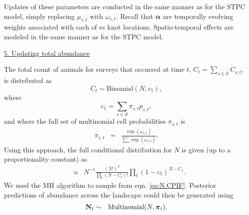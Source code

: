 \documentclass[12pt,fleqn]{article}
\begin{document}
\begin{flushleft}
Updates of these parameters are conducted in the same manner as for the STPC model, simply replacing
$\mu_{s,t}$ with $\omega_{s,t}$.  Recall that $\boldsymbol{\alpha}$ are temporally evolving weights associated
with each of $m$ knot locations.  Spatio-temporal effects are modeled in the same manner as for the STPC model.

\underline{5. Updating total abundance}

The total count of animals for surveys that occurred at time $t$, $C_t = \sum_{s \in \mathcal{S}} C_{s,t}$,
is distributed as
\begin{equation*}
  C_t \sim \textrm{Binomial}(N,\upsilon_t),
\end{equation*}
where
\begin{equation*}
  \upsilon_t= \sum_{s \in \mathcal{S}} \pi_{s,t} p_{s,t},
\end{equation*}
and where the full set of multinomial cell probabilities $\pi_{s,t}$ is
\begin{eqnarray*}
  \pi_{s,t} & = & \frac{ \exp(\omega_{s,t})}{\sum_s \exp(\omega_{s,t})}.
\end{eqnarray*}
Using this approach, the full conditional distribution for $N$ is given (up to a proportionality constant) as
\begin{eqnarray}
  [N | \cdot] & \propto & N^{-1} \frac{(N!)^T}{\prod_t (N-C_t)!}\prod_t (1-\upsilon_t)^{N-C_t}.
  \label{eq:N.CPIF}
\end{eqnarray}
We used the MH algorithm to sample from eqn. \ref{eq:N.CPIF}.  Posterior predictions of abundance across the landscape could then be generated using
\begin{eqnarray*}
  {\bf N}_{t} & \sim & \textrm{Multinomial}(N,\boldsymbol{\pi}_t).
\end{eqnarray*}



\renewcommand{\refname}{Literature Cited}




\end{flushleft}
\end{document}
